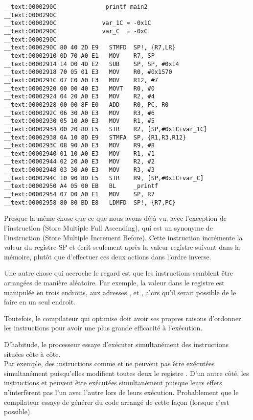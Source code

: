 \begin{lstlisting}[style=customasmARM]
__text:0000290C             _printf_main2
__text:0000290C
__text:0000290C             var_1C = -0x1C
__text:0000290C             var_C  = -0xC
__text:0000290C
__text:0000290C 80 40 2D E9   STMFD  SP!, {R7,LR}
__text:00002910 0D 70 A0 E1   MOV    R7, SP
__text:00002914 14 D0 4D E2   SUB    SP, SP, #0x14
__text:00002918 70 05 01 E3   MOV    R0, #0x1570
__text:0000291C 07 C0 A0 E3   MOV    R12, #7
__text:00002920 00 00 40 E3   MOVT   R0, #0
__text:00002924 04 20 A0 E3   MOV    R2, #4
__text:00002928 00 00 8F E0   ADD    R0, PC, R0
__text:0000292C 06 30 A0 E3   MOV    R3, #6
__text:00002930 05 10 A0 E3   MOV    R1, #5
__text:00002934 00 20 8D E5   STR    R2, [SP,#0x1C+var_1C]
__text:00002938 0A 10 8D E9   STMFA  SP, {R1,R3,R12}
__text:0000293C 08 90 A0 E3   MOV    R9, #8
__text:00002940 01 10 A0 E3   MOV    R1, #1
__text:00002944 02 20 A0 E3   MOV    R2, #2
__text:00002948 03 30 A0 E3   MOV    R3, #3
__text:0000294C 10 90 8D E5   STR    R9, [SP,#0x1C+var_C]
__text:00002950 A4 05 00 EB   BL     _printf
__text:00002954 07 D0 A0 E1   MOV    SP, R7
__text:00002958 80 80 BD E8   LDMFD  SP!, {R7,PC}
\end{lstlisting}

Presque la même chose que ce que nous avons déjà vu, avec l'exception de l'instruction
 (Store Multiple Full Ascending), qui est un synonyme de l'instruction
 (Store Multiple Increment Before).
Cette instruction incrémente la valeur du registre \ac{SP} et écrit seulement
après la valeur registre suivant dans la mémoire, plutôt que d'effectuer ces
deux actions dans l'ordre inverse.

Une autre chose qui accroche le regard est que les instructions semblent être arrangées
de manière aléatoire.
Par exemple, la valeur dans le registre  est manipulée en trois endroits,
aux adresses ,  et , alors qu'il serait possible
de le faire en un seul endroit.

Toutefois, le compilateur qui optimise doit avoir ses propres raisons d'ordonner
les instructions pour avoir une plus grande efficacité à l'exécution.

D'habitude, le processeur essaye d'exécuter simultanément des instructions situées côte à côte.\\
Par exemple, des instructions comme  et  ne
peuvent pas être exécutées simultanément puisqu'elles modifient toutes deux le
registre .
D'un autre côté, les instructions  et  peuvent
être exécutées simultanément puisque leurs effets n'interfèrent pas l'un avec l'autre
lors de leurs exécution.
Probablement que le compilateur essaye de générer du code arrangé de cette façon
(lorsque c'est possible).

